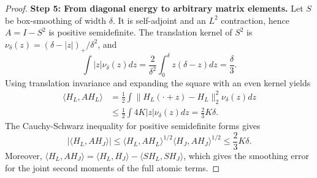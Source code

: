 \documentclass[a4paper,11pt]{article}
\theoremstyle{remark}
\begin{document}
\begin{proof}
\textbf{Step 5: From diagonal energy to arbitrary matrix elements.}
Let $S$ be box-smoothing of width $\delta$. It is self-adjoint and an $L^2$ contraction, hence
$A=I-S^2$ is positive semidefinite. The translation kernel of $S^2$ is
$\nu_\delta(z)=(\delta-|z|)_+/\delta^2$, and
\[
 \int|z|\nu_\delta(z)dz
 =\frac2{\delta^2}\int_0^\delta z(\delta-z)dz=\frac\delta3.
\]
Using translation invariance and expanding the square with an even kernel yields
\begin{align*}
 \langle H_L,AH_L\rangle
 &=\frac12\int\|H_L(\cdot+z)-H_L\|_2^2\nu_\delta(z)dz\\
 &\le\frac12\int4K|z|\nu_\delta(z)dz=\frac23K\delta.
\end{align*}
The Cauchy-Schwarz inequality for positive semidefinite forms gives
\[
 |\langle H_L,AH_J\rangle|
 \le\langle H_L,AH_L\rangle^{1/2}
 \langle H_J,AH_J\rangle^{1/2}\le\frac23K\delta.
\]
Moreover, $\langle H_L,AH_J\rangle=\langle H_L,H_J\rangle-
\langle SH_L,SH_J\rangle$, which gives the smoothing error for the joint second moments of the full atomic terms.
\end{proof}
\end{document}
